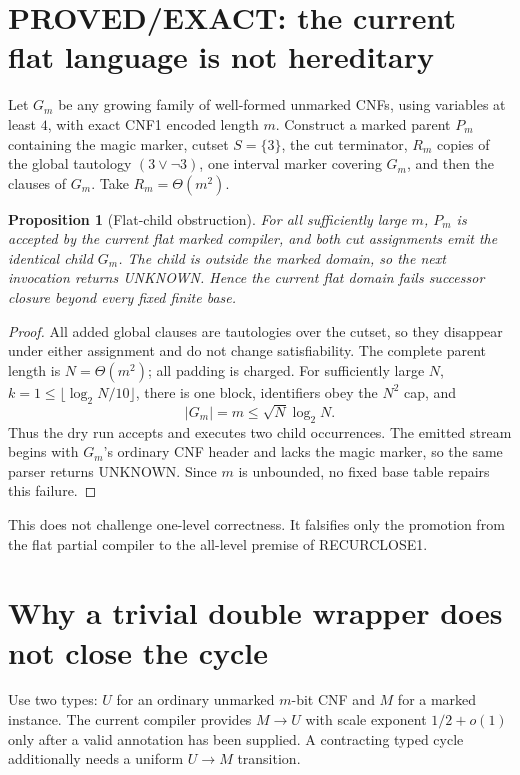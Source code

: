\documentclass[11pt]{article}
\newtheorem{proposition}[theorem]{Proposition}
\begin{document}
\section{PROVED/EXACT: the current flat language is not hereditary}
Let $G_m$ be any growing family of well-formed unmarked CNFs, using variables
at least $4$, with exact CNF1 encoded length $m$.  Construct a marked parent
$P_m$ containing the magic marker, cutset $S=\{3\}$, the cut terminator,
$R_m$ copies of the global tautology $(3\vee\neg3)$, one interval marker
covering $G_m$, and then the clauses of $G_m$.  Take
$R_m=\Theta(m^2)$.

\begin{proposition}[Flat-child obstruction]
For all sufficiently large $m$, $P_m$ is accepted by the current flat marked
compiler, and both cut assignments emit the identical child $G_m$.  The child
is outside the marked domain, so the next invocation returns UNKNOWN.  Hence
the current flat domain fails successor closure beyond every fixed finite base.
\end{proposition}

\begin{proof}
All added global clauses are tautologies over the cutset, so they disappear
under either assignment and do not change satisfiability.  The complete parent
length is $N=\Theta(m^2)$; all padding is charged.  For sufficiently large
$N$, $k=1\le\lfloor\log_2N/10\rfloor$, there is one block, identifiers obey
the $N^2$ cap, and
\[
 |G_m|=m\le \sqrt N\log_2N.                                \tag{8}
\]
Thus the dry run accepts and executes two child occurrences.  The emitted
stream begins with $G_m$'s ordinary CNF header and lacks the magic marker, so
the same parser returns UNKNOWN.  Since $m$ is unbounded, no fixed base table
repairs this failure.  \qedhere
\end{proof}

This does not challenge one-level correctness.  It falsifies only the
promotion from the flat partial compiler to the all-level premise of
RECURCLOSE1.

\section{Why a trivial double wrapper does not close the cycle}
Use two types: $U$ for an ordinary unmarked $m$-bit CNF and $M$ for a marked
instance.  The current compiler provides $M\to U$ with scale exponent
$1/2+o(1)$ only after a valid annotation has been supplied.  A contracting
typed cycle additionally needs a uniform $U\to M$ transition.
\end{document}
